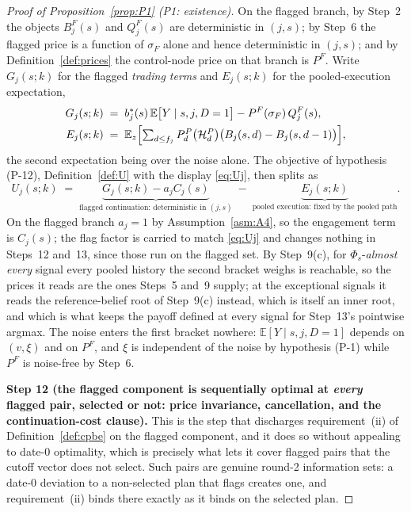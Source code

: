 \documentclass[11pt]{article}
\newcommand{\Eop}{\mathbb{E}}
\begin{document}
\begin{proof}[Proof of Proposition~\ref{prop:P1} (P1: existence)]
On the flagged branch, by Step~2 the objects $B_j^F(s)$ and $Q_j^F(s)$ are deterministic in $(j,s)$;
by Step~6 the flagged price is a function of $\sigma_F$ alone and hence deterministic in $(j,s)$; and
by Definition~\ref{def:prices} the control-node price on that branch is $P^F$. Write $G_j(s;k)$ for
the flagged \emph{trading terms} and $E_j(s;k)$ for the pooled-execution expectation,
\begin{align*}
G_j(s;k) &\;=\; b_j^*(s)\,\Eop\bigl[Y \mid s,j,D=1\bigr] - P^F(\sigma_F)\,Q_j^F(s),\\
E_j(s;k) &\;=\; \Eop_{z}\Bigl[\textstyle\sum_{d \le f_j} P_d^P\bigl(\mathcal H_d^P\bigr)
\bigl(B_j(s,d)-B_j(s,d-1)\bigr)\Bigr],
\end{align*}
the second expectation being over the noise alone. The objective of hypothesis (P-12),
Definition~\ref{def:U} with the display \eqref{eq:Uj}, then splits as
\begin{equation}
\label{eq:P1-Udecomp}
U_j(s;k) \;=\; \underbrace{G_j(s;k) - a_j C_j(s)}_{\text{flagged continuation: deterministic in }(j,s)}
\;-\; \underbrace{E_j(s;k)}_{\text{pooled execution: fixed by the pooled path}} .
\end{equation}
On the flagged branch $a_j = 1$ by
Assumption~\ref{asm:A4}, so the engagement term is $C_j(s)$; the flag factor is carried to match
\eqref{eq:Uj} and changes nothing in Steps~12 and~13, since those run on the flagged set. By
Step~9(c), for $\Phi_s$-\emph{almost every} signal every pooled history the second bracket weighs is
reachable, so the prices it reads are the ones Steps~5 and~9 supply; at the exceptional signals it
reads the reference-belief root of Step~9(c) instead, which is itself an inner root, and which is
what keeps the payoff defined at every signal for Step~13's pointwise argmax. The noise enters the
first bracket nowhere: $\Eop[Y \mid s,j,D=1]$ depends on $(v,\xi)$ and on $P^F$, and $\xi$ is
independent of the noise by hypothesis (P-1) while $P^F$ is noise-free by Step~6.

\smallskip
\noindent\textbf{Step 12 (the flagged component is sequentially optimal at \emph{every} flagged pair,
selected or not: price invariance, cancellation, and the continuation-cost clause).}
This is the step that discharges requirement~(ii) of Definition~\ref{def:cpbe} on the flagged
component, and it does so without appealing to date-$0$ optimality, which is precisely what lets
it cover flagged pairs that the cutoff vector does not select. Such pairs are genuine round-2
information sets: a date-$0$ deviation to a non-selected plan that flags creates one, and
requirement~(ii) binds there exactly as it binds on the selected plan.


\end{proof}
\end{document}
